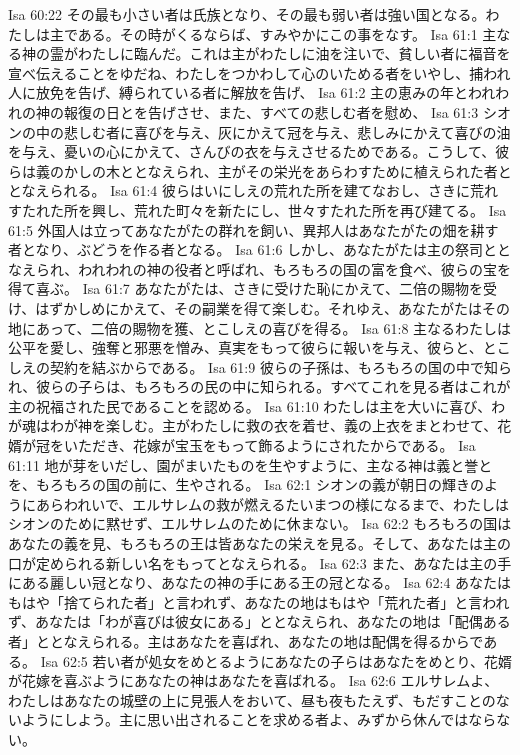 Isa 60:22  その最も小さい者は氏族となり、その最も弱い者は強い国となる。わたしは主である。その時がくるならば、すみやかにこの事をなす。
Isa 61:1  主なる神の霊がわたしに臨んだ。これは主がわたしに油を注いで、貧しい者に福音を宣べ伝えることをゆだね、わたしをつかわして心のいためる者をいやし、捕われ人に放免を告げ、縛られている者に解放を告げ、
Isa 61:2  主の恵みの年とわれわれの神の報復の日とを告げさせ、また、すべての悲しむ者を慰め、
Isa 61:3  シオンの中の悲しむ者に喜びを与え、灰にかえて冠を与え、悲しみにかえて喜びの油を与え、憂いの心にかえて、さんびの衣を与えさせるためである。こうして、彼らは義のかしの木ととなえられ、主がその栄光をあらわすために植えられた者ととなえられる。
Isa 61:4  彼らはいにしえの荒れた所を建てなおし、さきに荒れすたれた所を興し、荒れた町々を新たにし、世々すたれた所を再び建てる。
Isa 61:5  外国人は立ってあなたがたの群れを飼い、異邦人はあなたがたの畑を耕す者となり、ぶどうを作る者となる。
Isa 61:6  しかし、あなたがたは主の祭司ととなえられ、われわれの神の役者と呼ばれ、もろもろの国の富を食べ、彼らの宝を得て喜ぶ。
Isa 61:7  あなたがたは、さきに受けた恥にかえて、二倍の賜物を受け、はずかしめにかえて、その嗣業を得て楽しむ。それゆえ、あなたがたはその地にあって、二倍の賜物を獲、とこしえの喜びを得る。
Isa 61:8  主なるわたしは公平を愛し、強奪と邪悪を憎み、真実をもって彼らに報いを与え、彼らと、とこしえの契約を結ぶからである。
Isa 61:9  彼らの子孫は、もろもろの国の中で知られ、彼らの子らは、もろもろの民の中に知られる。すべてこれを見る者はこれが主の祝福された民であることを認める。
Isa 61:10  わたしは主を大いに喜び、わが魂はわが神を楽しむ。主がわたしに救の衣を着せ、義の上衣をまとわせて、花婿が冠をいただき、花嫁が宝玉をもって飾るようにされたからである。
Isa 61:11  地が芽をいだし、園がまいたものを生やすように、主なる神は義と誉とを、もろもろの国の前に、生やされる。
Isa 62:1  シオンの義が朝日の輝きのようにあらわれいで、エルサレムの救が燃えるたいまつの様になるまで、わたしはシオンのために黙せず、エルサレムのために休まない。
Isa 62:2  もろもろの国はあなたの義を見、もろもろの王は皆あなたの栄えを見る。そして、あなたは主の口が定められる新しい名をもってとなえられる。
Isa 62:3  また、あなたは主の手にある麗しい冠となり、あなたの神の手にある王の冠となる。
Isa 62:4  あなたはもはや「捨てられた者」と言われず、あなたの地はもはや「荒れた者」と言われず、あなたは「わが喜びは彼女にある」ととなえられ、あなたの地は「配偶ある者」ととなえられる。主はあなたを喜ばれ、あなたの地は配偶を得るからである。
Isa 62:5  若い者が処女をめとるようにあなたの子らはあなたをめとり、花婿が花嫁を喜ぶようにあなたの神はあなたを喜ばれる。
Isa 62:6  エルサレムよ、わたしはあなたの城壁の上に見張人をおいて、昼も夜もたえず、もだすことのないようにしよう。主に思い出されることを求める者よ、みずから休んではならない。
